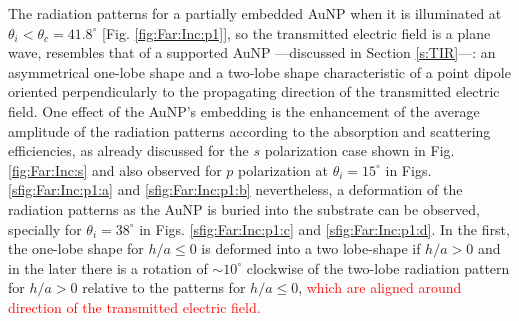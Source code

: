 The radiation patterns for a partially embedded AuNP when it is illuminated at $\theta_i < \theta_c = 41.8^\circ$ [Fig. \ref{fig:Far:Inc:p1}], so the transmitted electric field is a plane wave,  resembles  that of a supported AuNP ---discussed in Section \ref{s:TIR}---: an asymmetrical one-lobe shape and a two-lobe shape characteristic of a point dipole oriented perpendicularly to the propagating direction of the transmitted electric field. One effect of the AuNP's embedding is the enhancement of the average amplitude of the radiation patterns according to the absorption and scattering efficiencies, as already discussed for the $s$ polarization case shown in Fig. \ref{fig:Far:Inc:s} and also observed  for $p$ polarization at $\theta_i = 15^\circ$ in Figs. \ref{sfig:Far:Inc:p1:a} and \ref{sfig:Far:Inc:p1:b} nevertheless, a deformation of the radiation patterns as the AuNP is buried into the substrate can be observed, specially for $\theta_i = 38^\circ$ in Figs. \ref{sfig:Far:Inc:p1:c} and \ref{sfig:Far:Inc:p1:d}. In the first, the one-lobe shape for $h/a\leq 0$ is deformed into a two lobe-shape if $h/a>0$  and in the later there is a rotation of $\sim 10^\circ$ clockwise of the two-lobe radiation pattern for $h/a>0$ relative to the patterns for $h/a\leq0$, \textcolor{red}{which are aligned around direction of the transmitted electric field.}

